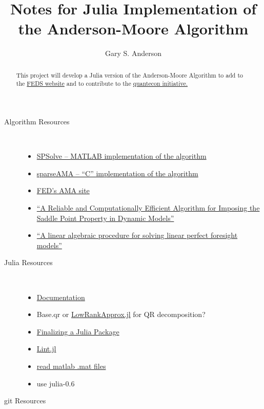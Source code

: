 \documentclass[12pt]{article}
\title{Notes for Julia Implementation of the Anderson-Moore Algorithm}
\author{Gary S. Anderson}
\begin{document}
\maketitle
\begin{abstract}
  This project will develop a Julia version of the Anderson-Moore Algorithm to add to the \href{https://www.federalreserve.gov/econres/ama-index.htm}{FEDS website}  and to contribute to the \href{http://quantecon.org/quantecon.jl}{quantecon initiative.}  
\end{abstract}
\begin{description}
\item[Algorithm Resources] \ 
\begin{itemize}
\item \href{https://github.com/es335mathwiz/SPSolve.git}{SPSolve -- MATLAB implementation of the algorithm}
\item \href{https://github.com/es335mathwiz/sparseAMA.git}{sparseAMA -- ``C'' implementation of the algorithm}
\item \href{https://www.federalreserve.gov/econres/ama-index.htm}{FED's AMA site}
\item \href{https://www.sciencedirect.com/science/article/pii/S1474667017405064}{``A Reliable and Computationally Efficient Algorithm for Imposing the Saddle Point Property in Dynamic Models''}
\item \href{https://www.sciencedirect.com/science/article/pii/0165176585902113}{``A linear algebraic procedure for solving linear perfect foresight models''}
\end{itemize}
\item[Julia Resources] \
  \begin{itemize}
  \item \href{https://docs.julialang.org/en/stable/}{Documentation}
  \item Base.qr or \href{https://github.com/JuliaMatrices/LowRankApprox.jl}{LowRankApprox.jl} for QR decomposition?
  \item \href{http://www.stochasticlifestyle.com/finalizing-julia-package-documentation-testing-coverage-publishing/}{Finalizing a Julia Package}
  \item \href{https://www.google.com/url?sa=t&rct=j&q=&esrc=s&source=web&cd=4&cad=rja&uact=8&ved=0ahUKEwjh_vH_h-DaAhUExYMKHYb7BWoQFgg5MAM&url=https%3A%2F%2Fgithub.com%2Ftonyhffong%2FLint.jl%2Fblob%2Fmaster%2Fdocs%2Ffeatures.md&usg=AOvVaw1FFQ9J64mhTjDx8QpQ-_zU}{Lint.jl}
 \item \href{https://github.com/JuliaIO/MAT.jl}{read matlab .mat files}
 \item use  julia-0.6
  \end{itemize}
\newpage
\item[git Resources] \ 


\end{description}
\end{document}
